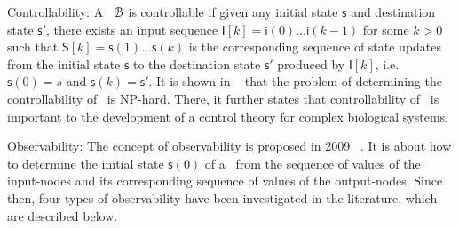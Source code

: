 

Controllability: %
A \BCN\ ${\mathcal{B}}$ is controllable if given any initial state $\mathsf{s}$ and destination state $\mathsf{s}'$, there exists an input sequence $\mathsf{I}[k]=\mathsf{i}(0)\ldots\mathsf{i}(k-1)$ for some $k>0$ such that $\mathsf{S}[k]=\mathsf{s}(1)\ldots\mathsf{s}(k)$ is the corresponding sequence of state updates from the initial state $\mathsf{s}$ to the destination state $\mathsf{s}'$ produced by $\mathsf{I}[k]$, i.e. $\mathsf{s}(0)=s$ and $\mathsf{s}(k)=\mathsf{s}'$. It is shown in ~\cite{Akutsu2007Control} that the problem of determining the controllability of \BCNs\ is {NP}-hard. There, it further states that controllability of \BCNs\ is important to the development of a control theory for complex biological systems.
%

Observability: The concept of observability is proposed in 2009 ~\cite{cheng2009controllability}. It is about how to determine the initial state $\mathsf{s}(0)$ of a \BCN\ from the sequence of values of the input-nodes and its corresponding sequence of values of the output-nodes. Since then, four types of observability have been investigated in the literature, which are described below.


